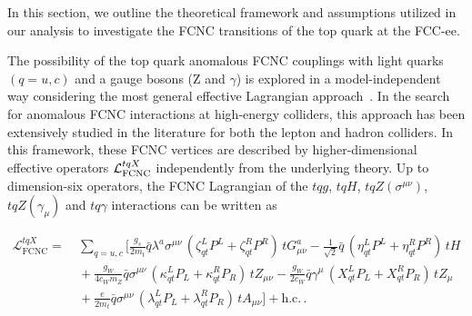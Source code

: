 \documentclass[11pt,onecolumn,english,showpacs,preprintnumbers,amsmath,amssymb,floatfix,nofootinbib]{revtex4-1}
\begin{document}
In this section, we outline the theoretical framework and assumptions utilized in 
our analysis to investigate the FCNC transitions of the top quark at the FCC-ee.

The possibility of the top quark anomalous FCNC couplings with light quarks $(q=u, c)$ and a 
gauge bosons (Z and $\gamma$) is explored in a 
model-independent way considering the 
most general effective Lagrangian approach~\cite{Aguilar-Saavedra:2004mfd,Aguilar-Saavedra:2008nuh}. 
In the search for anomalous FCNC interactions at high-energy colliders, this approach 
has been extensively studied in the literature for both the lepton and hadron colliders. 
In this framework, these FCNC vertices are described by higher-dimensional 
effective operators ${\cal L}_\text{FCNC}^{tqX}$ independently from the underlying theory. 
Up to dimension-six operators, the FCNC Lagrangian 
of the $tqg$, $tqH$, $t q Z (\sigma^{\mu \nu})$, 
$t q Z (\gamma_{\mu})$ and $tq\gamma$ 
interactions can be written as~\cite{Aguilar-Saavedra:2004mfd,Aguilar-Saavedra:2008nuh,Aguilar-Saavedra:2009ygx}

\begin{equation}
\label{Effective-Lagrangian}
\begin{split}
\mathcal{L}_{\text 
			{FCNC}}^{{tqX}} = &
		\ \sum_{q = u, c}
		\bigg[
		\frac{g_{s}}{2 m_t}
		\bar{q} \lambda^a
		\sigma^{{\mu} {\nu}} \,
		(\zeta_{qt}^L P^L
		+  \zeta_{qt}^R P^R) \, 
		t G^a_{{\mu} {\nu}} - \frac{1}{\sqrt{2}}
		\bar{q} \, (\eta_{qt}^L P^L
		+ \eta_{qt}^R P^R) \, t H   \\
		&\ + \frac{g_W}{4 c_W m_Z}
		\bar{q} \sigma^{{\mu} {\nu}} \,
		(\kappa_{qt}^L P_L
		+  \kappa_{qt}^R P_R)
		\, t Z_{{\mu} {\nu}}  - \frac{g_W}{2 c_W} \bar{q}
		\gamma^{\mu} \, (X_{qt}^L P_L +
		X_{qt}^R P_R) \, t Z_{\mu}   \\
		&\ + \frac{e}{2 m_t} \bar{q}
		\sigma^{{\mu} {\nu}} \,
		(\lambda_{qt}^L P_L
		+  \lambda_{qt}^R P_R) \,
		t A_{{\mu} {\nu}}  \bigg]
		+ \text{h.c.} \,.
\end{split}
\end{equation}
\end{document}

